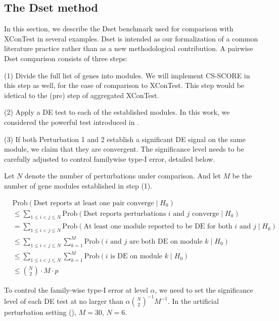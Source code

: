 \documentclass[11pt]{article}
\begin{document}
\subsection*{The Dset method}\label{app: p-value direct method}

In this section, we describe the Dset benchmark used for comparison with XConTest in several examples. Dset is intended as our formalization of a common literature practice rather than as a new methodological contribution. A pairwise Dset comparison consists of three steps:

(1) Divide the full list of genes into modules. We will implement CS-SCORE in this step as well, for the ease of comparison to XConTest. This step would be idetical to the (pre) step of aggregated XConTest.

(2) Apply a DE test to each of the established modules. In this work, we considered the powerful test introduced in \cite{10.1214/09-AOS716}.

(3) If both Perturbation 1 and 2 establish a significant DE signal on the same module, we claim that they are convergent. The significance level needs to be carefully adjusted to control familywise type-I error, detailed below.

Let $N$ denote the number of perturbations under comparison. And let $M$ be the number of gene modules established in step (1).

\begin{equation*}
    \begin{aligned}
        & \text{Prob}(\text{Dset reports at least one pair converge} \mid H_0) \\
        & \leq \sum_{1\leq i<j\leq N}\text{Prob}(\text{Dset reports perturbations $i$ and $j$ converge} \mid H_0)\\
        &  = \sum_{1\leq i<j\leq N} \text{Prob}(\text{At least one module reported to be DE for both $i$ and $j$} \mid H_0) \\
        & \leq \sum_{1\leq i<j\leq N} \sum_{k=1}^M \text{Prob}(\text{$i$ and $j$ are both DE on module $k$} \mid H_0) \\
        &\leq \sum_{1\leq i<j\leq N} \sum_{k=1}^M \text{Prob}(\text{$i$ is DE on module $k$} \mid H_0) \\
        &\leq \binom{N}{2} \cdot M \cdot p
    \end{aligned}
\end{equation*}

To control the family-wise type-I error at level $\alpha$, we need to set the significance level of each DE test at no larger than $\alpha\binom{N}{2}^{-1} M^{-1}$. In the artificial perturbation setting (), $M=30$, $N=6$.
\end{document}
